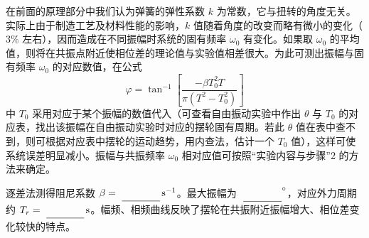 在前面的原理部分中我们认为弹簧的弹性系数 $k$ 为常数，它与扭转的角度无关。实际上由于制造工艺及材料性能的影响，$k$ 值随着角度的改变而略有微小的变化（$3\%$ 左右），因而造成在不同振幅时系统的固有频率 $\omega_0$ 有变化。如果取 $\omega_0$ 的平均值，则将在共振点附近使相位差的理论值与实验值相差很大。为此可测出振幅与固有频率 $\omega_0$ 的对应数值，在公式
\[
\varphi=\tan^{-1}\!\left[\frac{-\beta T_0^2T}{\pi(T^2-T_0^2)}\right]
\]
中 $T_0$ 采用对应于某个振幅的数值代入（可查看自由振动实验中作出 $\theta$ 与 $T_0$ 的对应表，找出该振幅在自由振动实验时对应的摆轮固有周期。若此 $\theta$ 值在表中查不到，则可根据对应表中摆轮的运动趋势，用内查法，估计一个 $T_0$ 值），这样可使系统误差明显减小。振幅与共振频率 $\omega_0$ 相对应值可按照“实验内容与步骤”2 的方法来确定。

逐差法测得阻尼系数 $\beta=\MathField{damping_beta_s_inv}\,\mathrm{s^{-1}}$。最大振幅为 $\MathField{peak_amplitude_deg}^{\circ}$，对应外力周期约 $T_r=\MathField{resonance_period_s}\,\mathrm{s}$。幅频、相频曲线反映了摆轮在共振附近振幅增大、相位差变化较快的特点。

\ifreportimages\ReportRecord\fi

